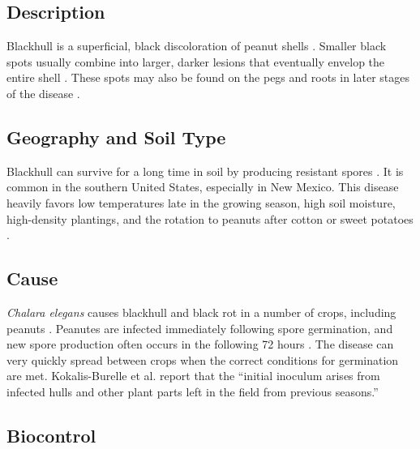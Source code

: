 \documentclass[letterpaper, 12pt]{report}
\begin{document}
\subsection{Description}

Blackhull is a superficial, black discoloration of peanut shells \autocite{kokalis1997compendium}. Smaller black spots usually combine into larger, darker lesions that eventually envelop the entire shell \autocite{kokalis1997compendium}. These spots may also be found on the pegs and roots in later stages of the disease \autocite{kokalis1997compendium}.

\subsection{Geography and Soil Type}

Blackhull can survive for a long time in soil by producing resistant spores \autocite{damicone2014soilborne}. It is common in the southern United States, especially in New Mexico. This disease heavily favors low temperatures late in the growing season, high soil moisture, high-density plantings, and the rotation to peanuts after cotton or sweet potatoes \autocite{kokalis1997compendium}.

\subsection{Cause}

\emph{Chalara elegans} causes blackhull and black rot in a number of crops, including peanuts \autocite{kokalis1997compendium}. Peanutes are infected immediately following spore germination, and new spore production often occurs in the following 72 hours \autocite{kokalis1997compendium}. The disease can very quickly spread between crops when the correct conditions for germination are met. Kokalis-Burelle et al. report that the ``initial inoculum arises from infected hulls and other plant parts left in the field from previous seasons.''

\subsection{Biocontrol}




\printbibliography[title=References]
\end{document}
